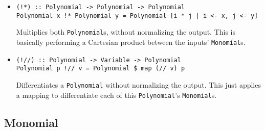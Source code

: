 \documentclass[11pt,a4paper]{article}
\begin{document}
\begin{itemize}
    \item \begin{lstlisting}
(!*) :: Polynomial -> Polynomial -> Polynomial
Polynomial x !* Polynomial y = Polynomial [i * j | i <- x, j <- y]
    \end{lstlisting}

          Multiplies both \lstinline{Polynomial}s, without normalizing the output. This is basically performing a Cartesian product between the inputs' \lstinline{Monomial}s.

    \item \begin{lstlisting}
(!//) :: Polynomial -> Variable -> Polynomial
Polynomial p !// v = Polynomial $ map (// v) p
    \end{lstlisting}

          Differentiates a \lstinline{Polynomial} without normalizing the output. This just applies a mapping to differentiate each of this \lstinline{Polynomial}'s \lstinline{Monomial}s.

\end{itemize}

\subsection{Monomial}
\end{document}
